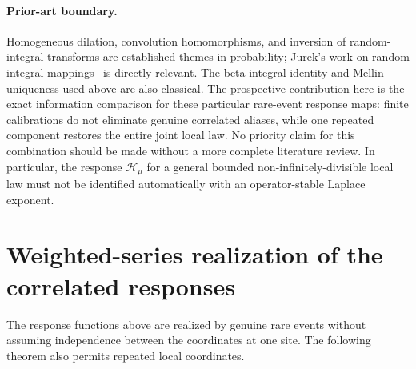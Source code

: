 \documentclass[11pt,letterpaper]{article}
\theoremstyle{definition}
\theoremstyle{remark}
\newcommand{\1}{\mathbf 1}
\begin{document}
\paragraph{Prior-art boundary.}
Homogeneous dilation, convolution homomorphisms, and inversion of
random-integral transforms are established themes in probability;
Jurek's work on random integral mappings~\cite{Jurek} is directly relevant.
The beta-integral identity and Mellin uniqueness used above are also
classical. The prospective contribution here is the exact information
comparison for these particular rare-event response maps: finite
calibrations do not eliminate genuine correlated aliases, while one
repeated component restores the entire joint local law.
No priority claim for this combination should be made without a more
complete literature review. In particular, the response
$\mathcal H_\mu$ for a general bounded non-infinitely-divisible local law
must not be identified automatically with an operator-stable Laplace
exponent.


\section{Weighted-series realization of the correlated responses}
\label{p06:sec:correlated-ldp}

The response functions above are realized by genuine rare events without
assuming independence between the coordinates at one site. The following
theorem also permits repeated local coordinates.
\end{document}
